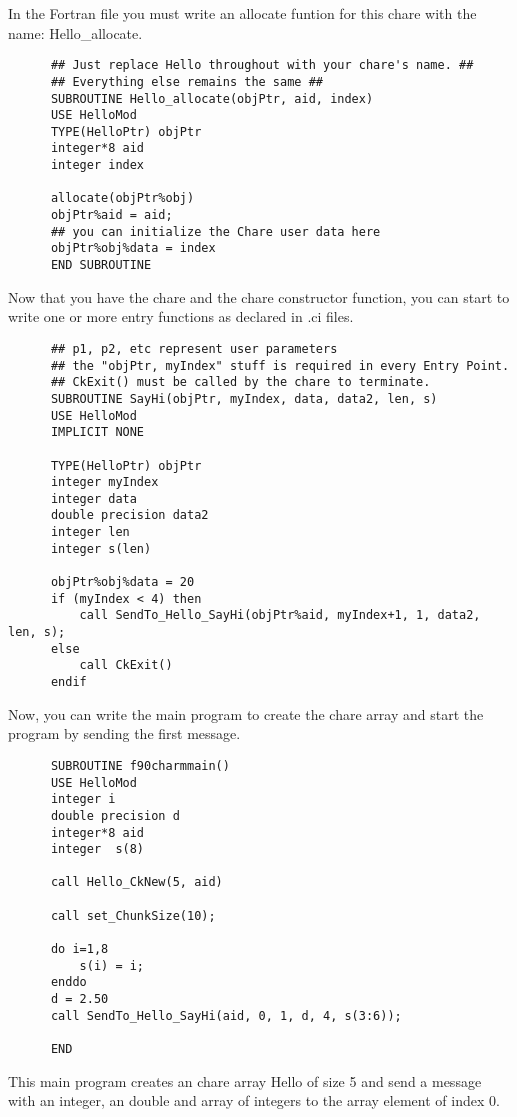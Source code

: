 \documentclass[11pt]{article}
\begin{document}
In the Fortran file you must write an allocate funtion for this chare
with the name: Hello\_allocate.

\begin{verbatim}
      ## Just replace Hello throughout with your chare's name. ##
      ## Everything else remains the same ##
      SUBROUTINE Hello_allocate(objPtr, aid, index)
      USE HelloMod
      TYPE(HelloPtr) objPtr 
      integer*8 aid
      integer index

      allocate(objPtr%obj)
      objPtr%aid = aid;
      ## you can initialize the Chare user data here
      objPtr%obj%data = index
      END SUBROUTINE
\end{verbatim}

Now that you have the chare and the chare constructor function, you can start
 to write one or more entry functions as declared in .ci files.
\begin{verbatim}
      ## p1, p2, etc represent user parameters
      ## the "objPtr, myIndex" stuff is required in every Entry Point.
      ## CkExit() must be called by the chare to terminate.
      SUBROUTINE SayHi(objPtr, myIndex, data, data2, len, s)
      USE HelloMod
      IMPLICIT NONE

      TYPE(HelloPtr) objPtr
      integer myIndex
      integer data
      double precision data2
      integer len
      integer s(len)

      objPtr%obj%data = 20
      if (myIndex < 4) then
          call SendTo_Hello_SayHi(objPtr%aid, myIndex+1, 1, data2, len, s);
      else 
          call CkExit()
      endif
\end{verbatim}

Now, you can write the main program to create the chare array and start the 
program by sending the first message.
\begin{verbatim}
      SUBROUTINE f90charmmain()
      USE HelloMod
      integer i
      double precision d
      integer*8 aid
      integer  s(8)

      call Hello_CkNew(5, aid)

      call set_ChunkSize(10);

      do i=1,8
          s(i) = i;
      enddo
      d = 2.50
      call SendTo_Hello_SayHi(aid, 0, 1, d, 4, s(3:6));

      END
\end{verbatim}
This main program creates an chare array Hello of size 5 and send a message with
an integer, an double and array of integers to the array element of index 0.
\end{document}
